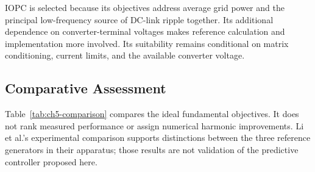 IOPC is selected because its objectives address average grid power and the principal low-frequency source of DC-link ripple together. Its additional dependence on converter-terminal voltages makes reference calculation and implementation more involved. Its suitability remains conditional on matrix conditioning, current limits, and the available converter voltage.

\subsection{Comparative Assessment}
Table~\ref{tab:ch5-comparison} compares the ideal fundamental objectives. It does not rank measured performance or assign numerical harmonic improvements. Li et al.'s experimental comparison supports distinctions between the three reference generators in their apparatus; those results are not validation of the predictive controller proposed here.
